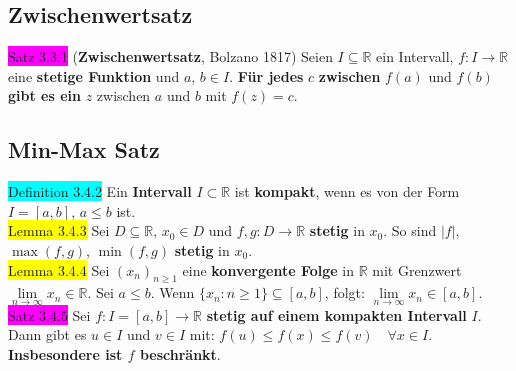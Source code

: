 \documentclass[landscape, 10pt]{article}
\newcommand{\R}{\mathbb{R}}
\begin{document}
\begin{multicols}{3}
       \subsection{Zwischenwertsatz}
              \colorbox{magenta}{Satz 3.3.1} 
              (\textbf{Zwischenwertsatz}, Bolzano 1817) 
                     Seien 
                     \textcolor{NavyBlue}{$I\subseteq\R$} ein Intervall, 
                     \textcolor{NavyBlue}{$f:I\longrightarrow\R$} 
                     eine \textbf{stetige Funktion} und 
                     \textcolor{NavyBlue}{$a$},
                     \textcolor{NavyBlue}{$b\in I$}. 
                     \textbf{Für jedes} \textcolor{NavyBlue}{$c$} 
                     \textbf{zwischen} 
                     \textcolor{NavyBlue}{$f(a)$} und 
                     \textcolor{NavyBlue}{$f(b)$} 
                     \textbf{gibt es ein} \textcolor{NavyBlue}{$z$} 
                     zwischen \textcolor{NavyBlue}{$a$} und 
                     \textcolor{NavyBlue}{$b$} mit 
                     \textcolor{NavyBlue}{$f(z)=c$}.
       \subsection{Min-Max Satz}
              \colorbox{cyan}{Definition 3.4.2}
                     Ein \textbf{Intervall} $I\subset\R$ ist 
                     \textbf{kompakt}, wenn es 
                     von der Form 
                     \textcolor{NavyBlue}{$I=[a,b]$}, 
                     \textcolor{NavyBlue}{$a\leqslant b$} ist.\\
              \colorbox{yellow}{Lemma 3.4.3} 
                     Sei \textcolor{NavyBlue}{$D\subseteq\R,\,x_0\in D$} und 
                     \textcolor{NavyBlue}{$f,g:D\longrightarrow\R$} 
                     \textbf{stetig} in \textcolor{NavyBlue}{$x_0$}. So sind 
                     \textcolor{NavyBlue}{$|f|$},
                     \textcolor{NavyBlue}{$\max(f,g)$},
                     \textcolor{NavyBlue}{$\min(f,g)$} 
                     \textbf{stetig} in 
                     \textcolor{NavyBlue}{$x_0$}.\\
              \colorbox{yellow}{Lemma 3.4.4} 
                     Sei \textcolor{NavyBlue}{$(x_n)_{n\geqslant1}$}
                     eine \textbf{konvergente Folge} in 
                     $\R$ mit Grenzwert 
                     \textcolor{NavyBlue}{$\lim\limits_{n\to\infty}x_n\in\R$}. 
                     Sei \textcolor{NavyBlue}{$a\leqslant b$}. 
                     Wenn \textcolor{NavyBlue}{$\{x_n:n\geqslant1\}\subseteq[a,b]$}, folgt: 
                     \textcolor{NavyBlue}{
                     $\lim\limits_{n\to\infty}x_n\in[a,b]$}. \\
              \colorbox{magenta}{Satz 3.4.5} Sei \textcolor{NavyBlue}{$f:I=[a,b]\longrightarrow\R$}
                     \textbf{stetig auf einem kompakten Intervall} \textcolor{NavyBlue}{$I$}. 
                     Dann gibt es \textcolor{NavyBlue}{$u\in I$} und 
                     \textcolor{NavyBlue}{$v\in I$} mit: 
                     \textcolor{NavyBlue}{
                     $f(u)\leqslant f(x)\leqslant f(v)\quad\forall x\in I$}. 
                     \textbf{Insbesondere ist 
                     \textcolor{NavyBlue}{$f$} beschränkt}.

\end{multicols}
\end{document}
